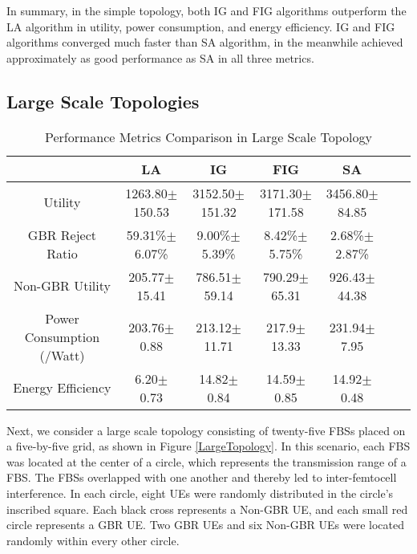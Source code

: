 \documentclass[conference]{IEEEtran}
\begin{document}
In summary, in the simple topology, both IG and FIG algorithms outperform the LA algorithm in utility, power consumption, and energy efficiency. IG and FIG algorithms converged much faster than SA algorithm, in the meanwhile achieved approximately as good performance as SA in all three metrics.










\subsection{Large Scale Topologies}
\begin{table*} \renewcommand{\arraystretch}{1}
\small
\begin{center}
\caption{Performance Metrics Comparison in Large Scale Topology} 
\begin{threeparttable}
	\centering 
	\begin{tabular}{|c|c|c|c|c|c|c|} 
	\hline  
	{\backslashbox{Metric}{Algorithm}  }&{LA}&{IG}&{FIG}&{SA}\\ 
	\hline
	Utility &1263.80$\pm$150.53 & 3152.50$\pm$151.32 & 3171.30$\pm$171.58 & 3456.80$\pm$84.85 \\
	\hline 
	GBR Reject Ratio &59.31\%$\pm$6.07\% & 9.00\%$\pm$5.39\% & 8.42\%$\pm$5.75\% & 2.68\%$\pm$2.87\% \\
	\hline	
	Non-GBR Utility  &205.77$\pm$15.41 & 786.51$\pm$59.14 & 790.29$\pm$65.31 & 926.43$\pm$44.38 \\
	\hline
	Power Consumption (/Watt) &203.76$\pm$0.88 & 213.12$\pm$11.71 & 217.9$\pm$13.33 & 231.94$\pm$7.95 \\
	\hline
	Energy Efficiency &6.20$\pm$0.73 & 14.82$\pm$0.84 & 14.59$\pm$0.85 & 14.92$\pm$0.48 \\
	\hline 
	\end{tabular}
\end{threeparttable}
\label{table_Large} 
\end{center}
\end{table*}

Next, we consider a large scale topology consisting of twenty-five FBSs placed on a five-by-five grid, as shown in Figure \ref{LargeTopology}. In this scenario, each FBS was located at the center of a circle, which represents the transmission range of a FBS. The FBSs overlapped with one another and thereby led to inter-femtocell interference. In each circle, eight UEs were randomly distributed in the circle's inscribed square. Each black cross represents a Non-GBR UE, and each small red circle represents a GBR UE. Two GBR UEs and six Non-GBR UEs were located randomly within every other circle.
\end{document}
